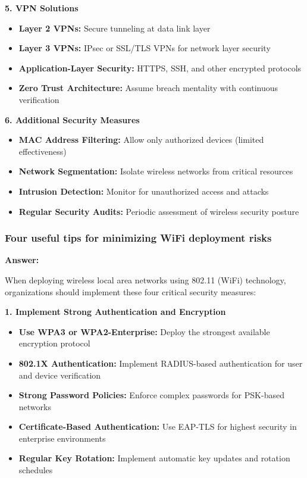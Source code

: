 \documentclass[12pt,a4paper]{article}
\begin{document}
\textbf{5. VPN Solutions}
\begin{itemize}
    \item \textbf{Layer 2 VPNs:} Secure tunneling at data link layer
    \item \textbf{Layer 3 VPNs:} IPsec or SSL/TLS VPNs for network layer security
    \item \textbf{Application-Layer Security:} HTTPS, SSH, and other encrypted protocols
    \item \textbf{Zero Trust Architecture:} Assume breach mentality with continuous verification
\end{itemize}

\textbf{6. Additional Security Measures}
\begin{itemize}
    \item \textbf{MAC Address Filtering:} Allow only authorized devices (limited effectiveness)
    \item \textbf{Network Segmentation:} Isolate wireless networks from critical resources
    \item \textbf{Intrusion Detection:} Monitor for unauthorized access and attacks
    \item \textbf{Regular Security Audits:} Periodic assessment of wireless security posture
\end{itemize}

\subsubsection{Four useful tips for minimizing WiFi deployment risks}

\textbf{Answer:}

When deploying wireless local area networks using 802.11 (WiFi) technology, organizations should implement these four critical security measures:

\textbf{1. Implement Strong Authentication and Encryption}
\begin{itemize}
    \item \textbf{Use WPA3 or WPA2-Enterprise:} Deploy the strongest available encryption protocol
    \item \textbf{802.1X Authentication:} Implement RADIUS-based authentication for user and device verification
    \item \textbf{Strong Password Policies:} Enforce complex passwords for PSK-based networks
    \item \textbf{Certificate-Based Authentication:} Use EAP-TLS for highest security in enterprise environments
    \item \textbf{Regular Key Rotation:} Implement automatic key updates and rotation schedules
\end{itemize}
\end{document}
